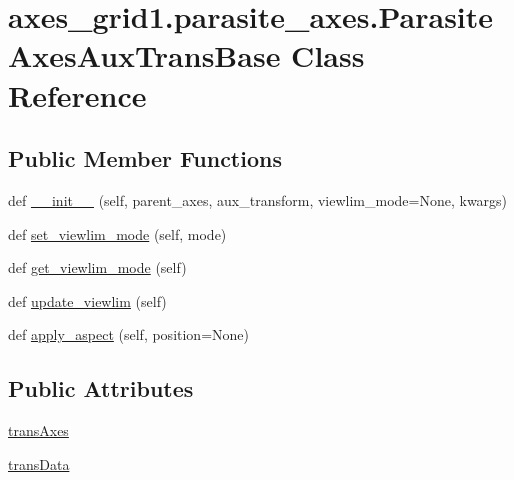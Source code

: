\hypertarget{classaxes__grid1_1_1parasite__axes_1_1ParasiteAxesAuxTransBase}{}\section{axes\+\_\+grid1.\+parasite\+\_\+axes.\+Parasite\+Axes\+Aux\+Trans\+Base Class Reference}
\label{classaxes__grid1_1_1parasite__axes_1_1ParasiteAxesAuxTransBase}
\subsection*{Public Member Functions}
\begin{DoxyCompactItemize}
\item 
def \hyperlink{classaxes__grid1_1_1parasite__axes_1_1ParasiteAxesAuxTransBase_a8d02eeb1b1eeaf0f635f850d3eee7ae5}{\+\_\+\+\_\+init\+\_\+\+\_\+} (self, parent\+\_\+axes, aux\+\_\+transform, viewlim\+\_\+mode=None, kwargs)
\item 
def \hyperlink{classaxes__grid1_1_1parasite__axes_1_1ParasiteAxesAuxTransBase_a10f6a46b2c9a37a3cdd9b7e0df7d620d}{set\+\_\+viewlim\+\_\+mode} (self, mode)
\item 
def \hyperlink{classaxes__grid1_1_1parasite__axes_1_1ParasiteAxesAuxTransBase_a6d7a4b12099a15506bc2d903704e63f9}{get\+\_\+viewlim\+\_\+mode} (self)
\item 
def \hyperlink{classaxes__grid1_1_1parasite__axes_1_1ParasiteAxesAuxTransBase_adc25dd545f1541f975d305e79752d711}{update\+\_\+viewlim} (self)
\item 
def \hyperlink{classaxes__grid1_1_1parasite__axes_1_1ParasiteAxesAuxTransBase_ab6729baf1aa7d6da39f91e005b792d3d}{apply\+\_\+aspect} (self, position=None)
\end{DoxyCompactItemize}
\subsection*{Public Attributes}
\begin{DoxyCompactItemize}
\item 
\hyperlink{classaxes__grid1_1_1parasite__axes_1_1ParasiteAxesAuxTransBase_a011d45d497b4687a443df93acff4dfd9}{trans\+Axes}
\item 
\hyperlink{classaxes__grid1_1_1parasite__axes_1_1ParasiteAxesAuxTransBase_aeccab37d54c9afa492270c3a99f210e9}{trans\+Data}
\end{DoxyCompactItemize}
